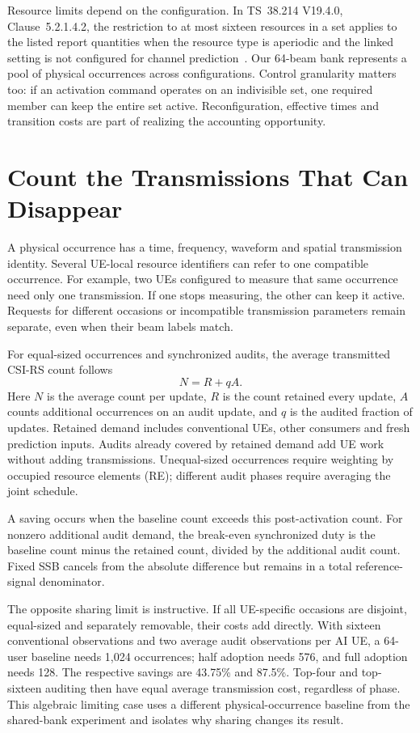 \documentclass[journal,10pt]{IEEEtran}
\begin{document}
Resource limits depend on the configuration. In TS~38.214 V19.4.0, Clause~5.2.1.4.2, the restriction to at most sixteen resources in a set applies to the listed report quantities when the resource type is aperiodic and the linked setting is not configured for channel prediction~\cite{ts38214}. Our 64-beam bank represents a pool of physical occurrences across configurations. Control granularity matters too: if an activation command operates on an indivisible set, one required member can keep the entire set active. Reconfiguration, effective times and transition costs are part of realizing the accounting opportunity.

\section{Count the Transmissions That Can Disappear}\label{sec:contract}
A physical occurrence has a time, frequency, waveform and spatial transmission identity. Several UE-local resource identifiers can refer to one compatible occurrence. For example, two UEs configured to measure that same occurrence need only one transmission. If one stops measuring, the other can keep it active. Requests for different occasions or incompatible transmission parameters remain separate, even when their beam labels match.

For equal-sized occurrences and synchronized audits, the average transmitted CSI-RS count follows
\begin{equation}
N=R+qA.
\label{eq:accounting}
\end{equation}
Here $N$ is the average count per update, $R$ is the count retained every update, $A$ counts additional occurrences on an audit update, and $q$ is the audited fraction of updates. Retained demand includes conventional UEs, other consumers and fresh prediction inputs. Audits already covered by retained demand add UE work without adding transmissions. Unequal-sized occurrences require weighting by occupied resource elements (RE); different audit phases require averaging the joint schedule.

A saving occurs when the baseline count exceeds this post-activation count. For nonzero additional audit demand, the break-even synchronized duty is the baseline count minus the retained count, divided by the additional audit count. Fixed SSB cancels from the absolute difference but remains in a total reference-signal denominator.

The opposite sharing limit is instructive. If all UE-specific occasions are disjoint, equal-sized and separately removable, their costs add directly. With sixteen conventional observations and two average audit observations per AI UE, a 64-user baseline needs 1,024 occurrences; half adoption needs 576, and full adoption needs 128. The respective savings are 43.75\% and 87.5\%. Top-four and top-sixteen auditing then have equal average transmission cost, regardless of phase. This algebraic limiting case uses a different physical-occurrence baseline from the shared-bank experiment and isolates why sharing changes its result.
\end{document}
